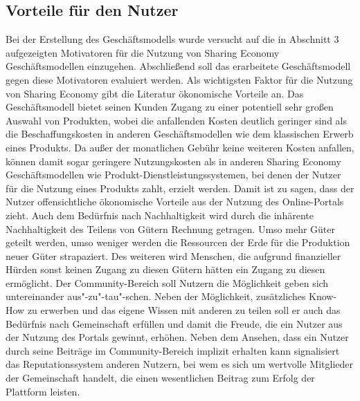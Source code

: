\documentclass[a4paper]{scrartcl}
\begin{document}
\begin{multicols}{2}
		\subsection{Vorteile f\"ur den Nutzer}
			Bei der Erstellung des Gesch\"aftsmodells wurde versucht auf die in Abschnitt 3 aufgezeigten Motivatoren f\"ur die Nutzung von Sharing Economy Gesch\"aftsmodellen einzugehen. Abschlie\ss end soll das erarbeitete Gesch\"aftsmodell gegen diese Motivatoren evaluiert werden. Als wichtigsten Faktor f\"ur die Nutzung von Sharing Economy gibt die Literatur \"okonomische Vorteile an. Das Gesch\"aftsmodell bietet seinen Kunden Zugang zu einer potentiell sehr gro\ss en Auswahl von Produkten, wobei die anfallenden Kosten deutlich geringer sind als die Beschaffungskosten in anderen Gesch\"aftsmodellen wie dem klassischen Erwerb eines Produkts. Da au\ss er der monatlichen Geb\"uhr keine weiteren Kosten anfallen, k\"onnen damit sogar geringere Nutzungskosten als in anderen Sharing Economy Gesch\"aftsmodellen wie Produkt-Dienstleistungssystemen, bei denen der Nutzer f\"ur die Nutzung eines Produkts zahlt, erzielt werden. Damit ist zu sagen, dass der Nutzer offensichtliche \"okonomische Vorteile aus der Nutzung des Online-Portals zieht.
			Auch dem Bed\"urfnis nach Nachhaltigkeit wird durch die inh\"arente Nachhaltigkeit des Teilens von G\"utern Rechnung getragen. Umso mehr G\"uter geteilt werden, umso weniger werden die Ressourcen der Erde f\"ur die Produktion neuer G\"uter strapaziert. Des weiteren wird Menschen, die aufgrund finanzieller H\"urden sonst keinen Zugang zu diesen G\"utern h\"atten ein Zugang zu diesen erm\"oglicht. Der Community-Bereich soll Nutzern die M\"oglichkeit geben sich untereinander aus"-zu"-tau"-schen. Neben der M\"oglichkeit, zus\"atzliches Know-How zu erwerben und das eigene Wissen mit anderen zu teilen soll er auch das Bed\"urfnis nach Gemeinschaft erf\"ullen und damit die Freude, die ein Nutzer aus der Nutzung des Portals gewinnt, erh\"ohen. Neben dem Ansehen, dass ein Nutzer durch seine Beitr\"age im Community-Bereich implizit erhalten kann signalisiert das Reputationssystem anderen Nutzern, bei wem es sich um wertvolle Mitglieder der Gemeinschaft handelt, die einen wesentlichen Beitrag zum Erfolg der Plattform leisten.
	
\end{multicols}



\newpage

\appendix
\end{document}
